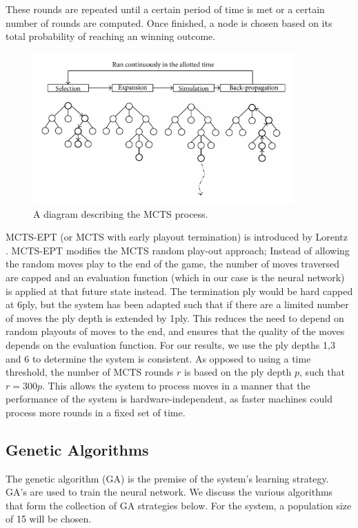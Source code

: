 \documentclass[12pt,a4paper]{article}
\begin{document}
        These rounds are repeated until a certain period of time is met or a certain number of rounds are computed. Once finished, a node is chosen based on its total probability of reaching an winning outcome.

        \begin{figure}[!h]
            \centering
            \includegraphics[width=100mm]{images/montecarlo.png}
            \caption{A diagram describing the MCTS process.}
        \end{figure}

        MCTS-EPT (or MCTS with early playout termination) is introduced by Lorentz \cite{lorentz_using_2016}. MCTS-EPT modifies the MCTS random play-out approach; Instead of allowing the random moves play to the end of the game, the number of moves traversed are capped and an evaluation function (which in our case is the neural network) is applied at that future state instead. The termination ply would be hard capped at 6ply, but the system has been adapted such that if there are a limited number of moves the ply depth is extended by 1ply. This reduces the need to depend on random playouts of moves to the end, and ensures that the quality of the moves depends on the evaluation function. For our results, we use the ply depths 1,3 and 6 to determine the system is consistent. As opposed to using a time threshold, the number of MCTS rounds $r$ is based on the ply depth $p$, such that $r=300p$. This allows the system to process moves in a manner that the performance of the system is hardware-independent, as faster machines could process more rounds in a fixed set of time.



    \subsection{Genetic Algorithms}
        The genetic algorithm (GA) is the premise of the system's learning strategy. GA's are used to train the neural network. We discuss the various algorithms that form the collection of GA strategies below. For the system, a population size of 15 will be chosen.
\end{document}

